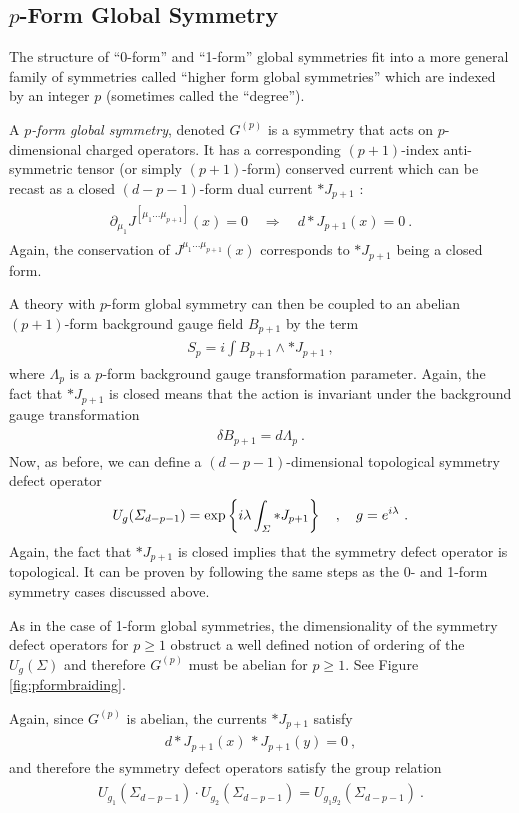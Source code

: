 \documentclass[11pt]{article}
\newcommand{\eq}[1]{\begin{align}\begin{split}#1\end{split}\end{align}}
\def\exp{{\rm exp}}
\begin{document}
\subsection{$p$-Form Global Symmetry}

The structure of ``0-form'' and ``1-form'' global symmetries fit into a more general family of symmetries called ``higher form global symmetries'' which are indexed by an integer $p$ (sometimes called the ``degree''). 

A \emph{$p$-form global symmetry}, denoted $G^{(p)}$ is a symmetry that acts on $p$-dimensional charged operators. It has a corresponding $(p+1)$-index anti-symmetric tensor (or simply $(p+1)$-form) conserved current which can be recast as a closed $(d-p-1)$-form dual current $\ast J_{p+1}$ :
\eq{
\partial_{\mu_1}J^{[\mu_1...\mu_{p+1}]}(x)=0\quad \Longrightarrow\quad d\ast J_{p+1}(x)=0~.
}
Again, the conservation of $J^{\mu_1...\mu_{p+1}}(x)$ corresponds to $\ast J_{p+1}$ being a closed form. 


A theory with $p$-form global symmetry can then be coupled to an abelian $(p+1)$-form background gauge field  $B_{p+1}$ by the term
 \eq{
 S_p = i \int B_{p+1}\wedge \ast J_{p+1}~,  
 }
 where $\Lambda_p$ is a $p$-form background gauge transformation parameter. Again, the fact that $\ast J_{p+1}$ is closed means that the action is invariant under the background gauge transformation 
\eq{
\delta B_{p+1}=d\Lambda_{p}~.
}
%
Now, as before, we can define a $(d-p-1)$-dimensional topological symmetry defect operator  
\eq{
 U_g(\Sigma_{d-p-1})=\exp\left\{i \lambda \int_\Sigma \ast J_{p+1}\right\}\quad, \quad g=e^{i \lambda}~.
}
%
Again, the fact that $\ast J_{p+1}$ is closed  implies that the symmetry defect operator is topological. It can be proven by following the same steps as the 0- and 1-form symmetry cases discussed above.

As in the case of 1-form global symmetries, the dimensionality of the symmetry defect operators for $p\geq1$ obstruct a well defined notion of ordering of the $ U_g(\Sigma)$ and therefore $G^{(p)}$ must be abelian for $p\geq 1$.  
See Figure \ref{fig:pformbraiding}.

Again, since $G^{(p)}$ is abelian, the currents $\ast J_{p+1}$ satisfy
\eq{
d\ast J_{p+1}(x) \,\ast J_{p+1}(y)=0~,
}
and therefore the symmetry defect operators satisfy the group relation 
\eq{
 U_{g_1}(\Sigma_{d-p-1})\cdot  U_{g_2}(\Sigma_{d-p-1})= U_{g_1g_2}(\Sigma_{d-p-1})~. 
}
\end{document}
